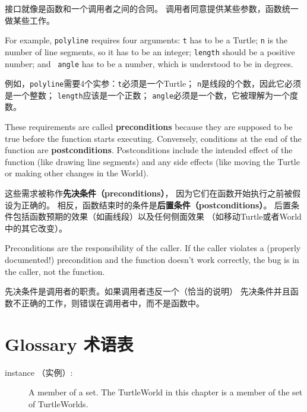 \documentclass[10pt]{book}
\begin{document}
\begin{CJK}{UTF8}{gbsn}
接口就像是函数和一个调用者之间的合同。
调用者同意提供某些参数，函数统一做某些工作。

For example, {\tt polyline} requires four arguments: {\tt t} has to be
a Turtle; {\tt n} is the number of line segments, so it has to be an
integer; {\tt length} should be a positive number; and {\tt
  angle} has to be a number, which is understood to be in degrees.
  
例如，{\tt polyline}需要4个实参：{\tt t}必须是一个Turtle；
{\tt n}是线段的个数，因此它必须是一个整数；
{\tt length}应该是一个正数；
{\tt angle}必须是一个数，它被理解为一个度数。

These requirements are called {\bf preconditions} because they
are supposed to be true before the function starts executing.
Conversely, conditions at the end of the function are
{\bf postconditions}.  Postconditions include the intended
effect of the function (like drawing line segments) and any
side effects (like moving the Turtle or making other changes
in the World).

这些需求被称作{\bf 先决条件（preconditions）}，
因为它们在函数开始执行之前被假设为正确的。
相反，函数结束时的条件是{\bf 后置条件（postconditions）}。
后置条件包括函数预期的效果（如画线段）以及任何侧面效果
（如移动Turtle或者World中的其它改变）。

Preconditions are the responsibility of the caller.  If the caller
violates a (properly documented!) precondition and the function
doesn't work correctly, the bug is in the caller, not the function.

先决条件是调用者的职责。如果调用者违反一个（恰当的说明）
先决条件并且函数不正确的工作，则错误在调用者中，而不是函数中。



\section{Glossary 术语表}

\begin{description}

\item[instance （实例）:] A member of a set.  The TurtleWorld in this
chapter is a member of the set of TurtleWorlds.


\end{description}
\end{CJK}
\end{document}
